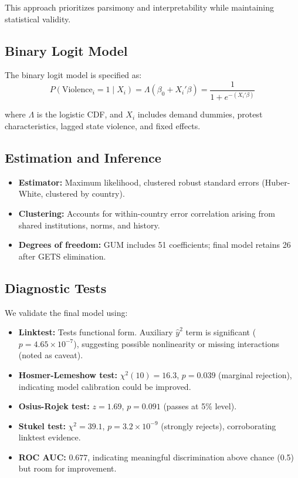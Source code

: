 \documentclass[11pt,a4paper]{article}
\begin{document}
This approach prioritizes parsimony and interpretability while maintaining statistical validity.

\subsection{Binary Logit Model}

The binary logit model is specified as:
\begin{equation}
P(\text{Violence}_i = 1 \mid X_i) = \Lambda(\beta_0 + X_i' \beta) = \frac{1}{1 + e^{-(X_i' \beta)}}
\end{equation}

where $\Lambda$ is the logistic CDF, and $X_i$ includes demand dummies, protest characteristics, lagged state violence, and fixed effects.

\subsection{Estimation and Inference}

\begin{itemize}
    \item \textbf{Estimator:} Maximum likelihood, clustered robust standard errors (Huber-White, clustered by country).
    \item \textbf{Clustering:} Accounts for within-country error correlation arising from shared institutions, norms, and history.
    \item \textbf{Degrees of freedom:} GUM includes 51 coefficients; final model retains 26 after GETS elimination.
\end{itemize}

\subsection{Diagnostic Tests}

We validate the final model using:

\begin{itemize}
    \item \textbf{Linktest:} Tests functional form. Auxiliary $\hat{y}^2$ term is significant ($p = 4.65 \times 10^{-7}$), suggesting possible nonlinearity or missing interactions (noted as caveat).
    \item \textbf{Hosmer-Lemeshow test:} $\chi^2(10) = 16.3$, $p = 0.039$ (marginal rejection), indicating model calibration could be improved.
    \item \textbf{Osius-Rojek test:} $z = 1.69$, $p = 0.091$ (passes at 5\% level).
    \item \textbf{Stukel test:} $\chi^2 = 39.1$, $p = 3.2 \times 10^{-9}$ (strongly rejects), corroborating linktest evidence.
    \item \textbf{ROC AUC:} $0.677$, indicating meaningful discrimination above chance (0.5) but room for improvement.
\end{itemize}
\end{document}
